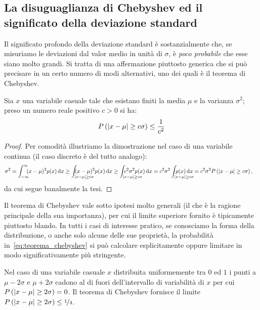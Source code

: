 \subsection{La disuguaglianza di Chebyshev ed il significato della deviazione
  standard}

Il significato profondo della deviazione standard è sostanzialmente che,
se misuriamo le deviazioni dal valor medio in unità di $\sigma$, è
\emph{poco probabile} che esse siano molto grandi. Si tratta di una
affermazione piuttosto generica che si può precisare in un certo numero
di modi alternativi, uno dei quali è il teorema di Chebyshev.

\begin{theorem}[di Chebyshev]
  Sia $x$ una variabile casuale tale che esistano finiti la media $\mu$
  e la varianza $\sigma^2$; preso un numero reale positivo $c > 0$ si ha:
  \begin{align}\label{eq:teorema_chebyshev}
    \displaystyle P\left(\left| x - \mu \right| \ge c\sigma\right) \le \frac{1}{c^2}
  \end{align}
\end{theorem}
\begin{proof}
  Per comodità illustriamo la dimostrazione nel caso di una variabile
  continua (il caso discreto è del tutto analogo):
  \begin{align*}
    \sigma^2 & = \intinf(x - \mu)^2p(x)\diff \ge
    \int_{\abs{x - \mu} \ge c\sigma} \!\!\!\!\!\!\!\!\!\!\!\!\!\!\!\!\!\!\!\!\!
    (x - \mu)^2p(x) \diff \ge
    \int_{\abs{x - \mu} \ge c\sigma} \!\!\!\!\!\!\!\!\!\!\!\!\!\!\!\!\!\!\!\!\!
    c^2\sigma^2 p(x) \diff =
    c^2\sigma^2 \int_{\abs{x - \mu} \ge c\sigma}
    \!\!\!\!\!\!\!\!\!\!\!\!\!\!\!\!\!\!\!\!\! p(x) \diff =
    c^2\sigma^2 \prob{\abs{x - \mu} \ge c\sigma},
  \end{align*}
  da cui segue banalmente la tesi.
\end{proof}

Il teorema di Chebyshev vale sotto ipotesi molto generali (il che è la
ragione principale della sua importanza), per cui il limite
superiore fornito è tipicamente piuttosto blando. In tutti i casi di
interesse pratico, se conosciamo la forma della distribuzione, o anche solo
alcune delle sue proprietà, la probabilità in~\eqref{eq:teorema_chebyshev}
si può calcolare esplicitamente oppure limitare in modo significativamente
più stringente.

\begin{examplebox}
  \begin{example}
    Nel caso di una variabile casuale $x$ distribuita uniformemente tra $0$ ed
    $1$ i punti a $\mu - 2\sigma$ e $\mu + 2\sigma$ cadono al di fuori
    dell'intervallo di variabilità di $x$ per cui
    $\displaystyle P\left(\left| x-\mu \right| \ge 2\sigma\right) = 0$. Il teorema di Chebyshev fornisce il
    limite $\displaystyle P\left(\left| x-\mu \right| \ge 2\sigma\right) \le \nicefrac{1}{4}$.
  \end{example}
\end{examplebox}

